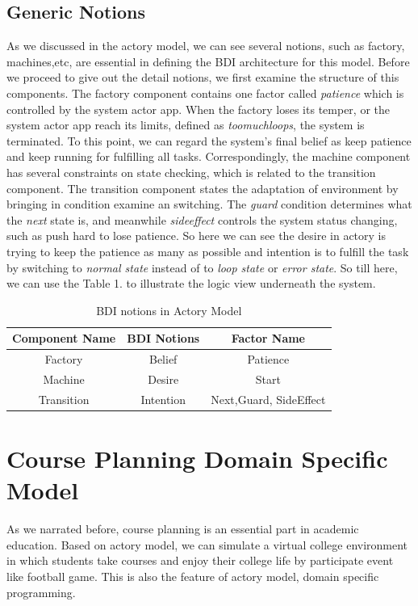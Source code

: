 \documentclass{sig-alternate}
\begin{document}
\subsection{Generic Notions}
As we discussed in the actory model, we can see several notions, such as factory, machines,etc, are essential in defining the BDI architecture for this model.  Before we proceed to give out the detail notions, we first examine the structure of this components.  The factory component contains one factor called {\em patience} which is controlled by the system actor app.  When the factory loses its temper, or the system actor app reach its limits, defined as {\em toomuchloops},  the system  is terminated.   To this point, we can regard the system's final belief as keep patience and keep running for fulfilling all tasks.  Correspondingly,  the machine component has several constraints on state checking, which is related to the transition component.  The transition component states the adaptation of environment by bringing in condition examine an switching.  The {\em guard} condition determines what the {\em next} state is, and  meanwhile {\em sideeffect} controls the system status changing, such as push hard to lose patience.   So here we can see the desire in actory is trying to keep the patience as many as possible and intention is to fulfill the task by switching to {\em normal state} instead of to {\em loop state }or {\em error state}.   So till here, we can use the Table 1. to illustrate the logic view underneath the system.
\begin{table}[h]
\centering
\caption{BDI notions in Actory Model}
\begin{tabular}{|c|c|c|}\hline
Component Name & BDI Notions & Factor Name \\
\hline
Factory & Belief & Patience\\
\hline
Machine & Desire & Start \\
\hline
Transition & Intention & Next,Guard, SideEffect \\
\hline
\end{tabular}
\end{table}

\section{Course Planning Domain Specific Model}
As we narrated before, course planning is an essential part in academic education.  Based on actory model, we can simulate a virtual college environment in which students take courses and enjoy their college life by participate event like football game.  This is also the feature of actory model, domain specific programming.  \\
\end{document}
